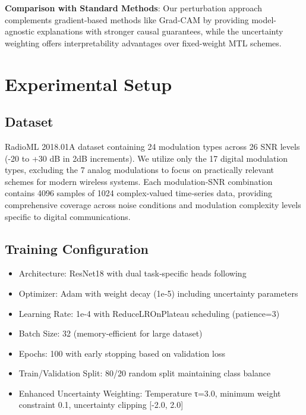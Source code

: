 \documentclass{ELSP}
\begin{document}
\textbf{Comparison with Standard Methods}: Our perturbation approach complements gradient-based methods like Grad-CAM \cite{selvaraju2017grad} by providing model-agnostic explanations with stronger causal guarantees, while the uncertainty weighting offers interpretability advantages over fixed-weight MTL schemes.

\section{Experimental Setup}

\subsection{Dataset}
RadioML 2018.01A dataset containing 24 modulation types across 26 SNR levels (-20 to +30 dB in 2dB increments). We utilize only the 17 digital modulation types, excluding the 7 analog modulations to focus on practically relevant schemes for modern wireless systems. Each modulation‑SNR combination contains 4096 samples of 1024 complex‑valued time‑series data, providing comprehensive coverage across noise conditions and modulation complexity levels specific to digital communications.

\subsection{Training Configuration}
\begin{itemize}
\item Architecture: ResNet18 with dual task‑specific heads following \cite{kumar2023automatic}
\item Optimizer: Adam with weight decay (1e‑5) including uncertainty parameters
\item Learning Rate: 1e‑4 with ReduceLROnPlateau scheduling (patience=3)
\item Batch Size: 32 (memory‑efficient for large dataset)
\item Epochs: 100 with early stopping based on validation loss
\item Train/Validation Split: 80/20 random split maintaining class balance
\item Enhanced Uncertainty Weighting: Temperature τ=3.0, minimum weight constraint 0.1, uncertainty clipping [-2.0, 2.0]
\end{itemize}
\end{document}
